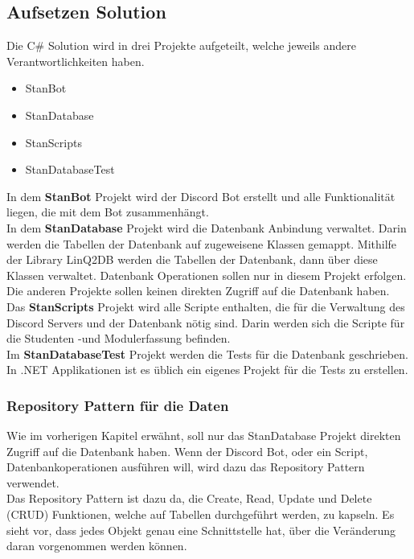 \documentclass[a4paper, table]{article}
\begin{document}
\subsection{Aufsetzen Solution}
Die C\# Solution wird in drei Projekte aufgeteilt, welche jeweils andere Verantwortlichkeiten haben.
\begin{itemize}
    \item StanBot
    \item StanDatabase
    \item StanScripts
    \item StanDatabaseTest
\end{itemize}

In dem \textbf{StanBot} Projekt wird der Discord Bot erstellt und alle Funktionalität liegen,
die mit dem Bot zusammenhängt.\\
In dem \textbf{StanDatabase} Projekt wird die Datenbank Anbindung verwaltet.
Darin werden die Tabellen der Datenbank auf zugeweisene Klassen gemappt.
Mithilfe der Library LinQ2DB werden die Tabellen der Datenbank, dann über diese Klassen verwaltet.
Datenbank Operationen sollen nur in diesem Projekt erfolgen. 
Die anderen Projekte sollen keinen direkten Zugriff auf die Datenbank haben.\\
Das \textbf{StanScripts} Projekt wird alle Scripte enthalten, 
die für die Verwaltung des Discord Servers und der Datenbank nötig sind.
Darin werden sich die Scripte für die Studenten -und Modulerfassung befinden.\\
Im \textbf{StanDatabaseTest} Projekt werden die Tests für die Datenbank geschrieben.
In .NET Applikationen ist es üblich ein eigenes Projekt für die Tests zu erstellen.\autocite{tdykstra_organisieren_nodate}

\subsubsection{Repository Pattern für die Daten}
Wie im vorherigen Kapitel erwähnt, soll nur das StanDatabase Projekt direkten Zugriff auf die Datenbank haben.
Wenn der Discord Bot, oder ein Script, Datenbankoperationen ausführen will, wird dazu das Repository Pattern verwendet.\\
Das Repository Pattern ist dazu da, die Create, Read, Update und Delete (CRUD) Funktionen, 
welche auf Tabellen durchgeführt werden, zu kapseln. \autocite{gosebrink_aspnet_2014}
Es sieht vor, dass jedes Objekt genau eine Schnittstelle hat, über die Veränderung daran vorgenommen werden können.
\end{document}
